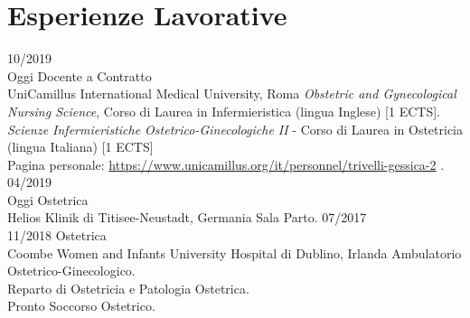 \documentclass[11pt]{friggeri-cv}
\begin{document}
\vspace{-20pt}
\section{Esperienze Lavorative}
\begin{entrylist}
  \entry
  {10/2019\\Oggi}
  {Docente a Contratto}
  {\\UniCamillus International Medical University, Roma}
  {
    \emph{Obstetric and Gynecological Nursing Science}, Corso di Laurea in Infermieristica (lingua Inglese) [1 ECTS].\\
    \emph{Scienze Infermieristiche Ostetrico-Ginecologiche II} - Corso di Laurea in Ostetricia (lingua Italiana) [1 ECTS] \\
    Pagina personale:
    \footnotesize{\url{https://www.unicamillus.org/it/personnel/trivelli-gessica-2}} .
  }
  \entry
  {04/2019\\Oggi}
  {Ostetrica}
  {\\Helios Klinik di Titisee-Neustadt, Germania}
  {Sala Parto.}
  \entry
  {07/2017\\11/2018}
  {Ostetrica}
  {\\Coombe Women and Infants University Hospital di Dublino, Irlanda}
  {Ambulatorio Ostetrico-Ginecologico.\\
    Reparto di Ostetricia e Patologia Ostetrica.\\
    Pronto Soccorso Ostetrico.}
\end{entrylist}
\vspace{-10pt}
\end{document}
